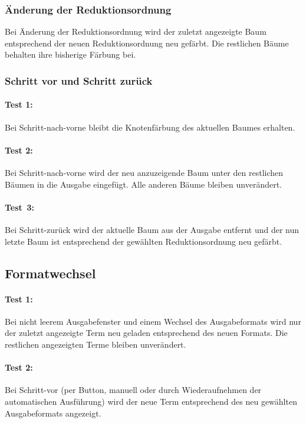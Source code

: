 \documentclass[parskip=full,11pt,openany]{scrreprt}
\begin{document}
\subsubsection{Änderung der Reduktionsordnung}
Bei Änderung der Reduktionsordnung wird der zuletzt angezeigte Baum entsprechend der neuen Reduktionsordnung neu gefärbt. Die restlichen Bäume behalten ihre bisherige Färbung bei.

\subsubsection{Schritt vor und Schritt zurück}
\paragraph{Test 1:} Bei Schritt-nach-vorne bleibt die Knotenfärbung des aktuellen Baumes erhalten.

\paragraph{Test 2:} Bei Schritt-nach-vorne wird der neu anzuzeigende Baum unter den restlichen Bäumen in die Ausgabe eingefügt. Alle anderen Bäume bleiben unverändert.

\paragraph{Test\, 3:} Bei Schritt-zurück wird der aktuelle Baum aus der Ausgabe entfernt und der nun letzte Baum ist entsprechend der gewählten Reduktionsordnung neu gefärbt.

\subsection{Formatwechsel}
\paragraph{Test 1:} Bei nicht leerem Ausgabefenster und einem Wechsel des Ausgabeformats wird nur der zuletzt angezeigte Term neu geladen entsprechend des neuen Formats. Die restlichen angezeigten Terme bleiben unverändert.

\paragraph{Test 2:} Bei Schritt-vor (per Button, manuell oder durch Wiederaufnehmen der automatischen Ausführung) wird der neue Term entsprechend des neu gewählten Ausgabeformats angezeigt. 
\end{document}

